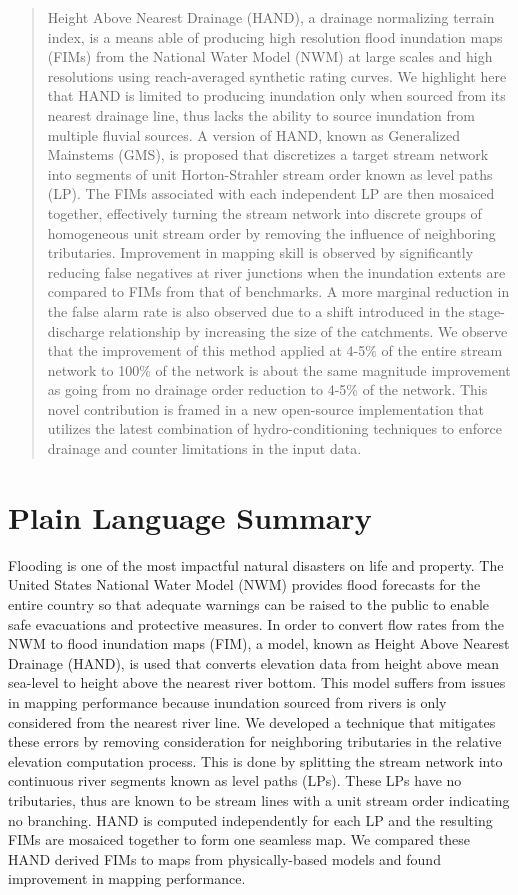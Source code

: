 \documentclass[draft]{dependencies/agujournal2019}
\begin{document}

\begin{abstract}
Height Above Nearest Drainage (HAND), a drainage normalizing terrain index, is a means able of producing high resolution flood inundation maps (FIMs) from the National Water Model (NWM) at large scales and high resolutions using reach-averaged synthetic rating curves. 
We highlight here that HAND is limited to producing inundation only when sourced from its nearest drainage line, thus lacks the ability to source inundation from multiple fluvial sources.
A version of HAND, known as Generalized Mainstems (GMS), is proposed that discretizes a target stream network into segments of unit Horton-Strahler stream order known as level paths (LP).
The FIMs associated with each independent LP are then mosaiced together, effectively turning the stream network into discrete groups of homogeneous unit stream order by removing the influence of neighboring tributaries.
Improvement in mapping skill is observed by significantly reducing false negatives at river junctions when the inundation extents are compared to FIMs from that of benchmarks.
A more marginal reduction in the false alarm rate is also observed due to a shift introduced in the stage-discharge relationship by increasing the size of the catchments.
We observe that the improvement of this method applied at 4-5\% of the entire stream network to 100\% of the network is about the same magnitude improvement as going from no drainage order reduction to 4-5\% of the network.
This novel contribution is framed in a new open-source implementation that utilizes the latest combination of hydro-conditioning techniques to enforce drainage and counter limitations in the input data.
\end{abstract}
%
\section*{Plain Language Summary}
Flooding is one of the most impactful natural disasters on life and property.
The United States National Water Model (NWM) provides flood forecasts for the entire country so that adequate warnings can be raised to the public to enable safe evacuations and protective measures.
In order to convert flow rates from the NWM to flood inundation maps (FIM), a model, known as Height Above Nearest Drainage (HAND), is used that converts elevation data from height above mean sea-level to height above the nearest river bottom.
This model suffers from issues in mapping performance because inundation sourced from rivers is only considered from the nearest river line.
We developed a technique that mitigates these errors by removing consideration for neighboring tributaries in the relative elevation computation process.
This is done by splitting the stream network into continuous river segments known as level paths (LPs).
These LPs have no tributaries, thus are known to be stream lines with a unit stream order indicating no branching.
HAND is computed independently for each LP and the resulting FIMs are mosaiced together to form one seamless map.
We compared these HAND derived FIMs to maps from physically-based models and found improvement in mapping performance.
%
 
\end{document}
